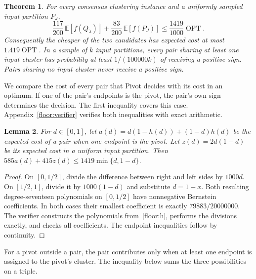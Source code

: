 \documentclass[11pt]{article}
\newtheorem{theorem}{Theorem}[section]
\newtheorem{lemma}[theorem]{Lemma}
\begin{document}
\begin{theorem}\label{floor:main}
For every consensus clustering instance and a uniformly sampled input partition
$P_J$,
\[
 \frac{117}{200}\,\mathbb E[f(Q_\lambda)]
 +\frac{83}{200}\,\mathbb E[f(P_J)]
 \le \frac{1419}{1000}\operatorname{OPT}.
\]
Consequently the cheaper of the two candidates has expected cost at
most $1.419\operatorname{OPT}$. In a sample of $k$ input
partitions, every pair sharing at least one input cluster has probability
at least $1/(100000k)$ of receiving a positive sign. Pairs sharing no input
cluster never receive a positive sign.
\end{theorem}

We compare the cost of every pair that Pivot decides with its cost
in an optimum. If one of the pair's endpoints is the pivot, the
pair's own sign determines the decision. The first inequality
covers this case. Appendix~\ref{floor:verifier} verifies both
inequalities with exact arithmetic.

\begin{lemma}\label{floor:pair}
For $d\in[0,1]$, let $a(d)=d(1-h(d))+(1-d)h(d)$ be the expected
cost of a pair when one endpoint is the pivot. Let $z(d)=2d(1-d)$
be its expected cost in a uniform input partition. Then
$585a(d)+415z(d)\le1419\min\{d,1-d\}$.
\end{lemma}
\begin{proof}
On $[0,1/2]$, divide the difference between right and left sides by
$1000d$. On $[1/2,1]$, divide it by $1000(1-d)$ and substitute $d=1-x$.
Both resulting degree-seventeen polynomials on $[0,1/2]$ have
nonnegative Bernstein coefficients.  In both cases their smallest
coefficient is exactly $79883/20000000$.  The verifier constructs the
polynomials from~\eqref{floor:h}, performs the divisions exactly, and
checks all coefficients.  The endpoint inequalities follow by continuity.
\end{proof}

For a pivot outside a pair, the pair contributes only when at least one endpoint is
assigned to the pivot's cluster. The inequality below sums the three possibilities on a
triple.
\end{document}
